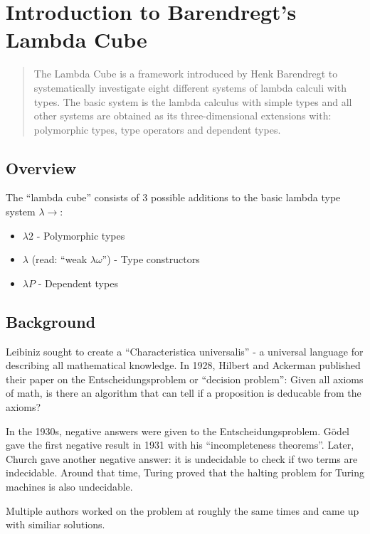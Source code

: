 \section{Introduction to Barendregt's Lambda Cube}
\begin{abstract}
	The Lambda Cube is a framework introduced by Henk Barendregt to systematically investigate eight different systems of lambda calculi with types. The basic system is the lambda calculus with simple types and all other systems are obtained as its three-dimensional extensions with: polymorphic types, type operators and dependent types.
\end{abstract}

\subsection{Overview}
The ``lambda cube'' consists of 3 possible additions to the basic lambda type system $\lambda\to$:
\begin{itemize}
	\item $\lambda2$ - Polymorphic types
	\item $\lambda$\underbar{$\omega$} (read: ``weak $\lambda\omega$'') - Type constructors
	\item $\lambda P$ - Dependent types
\end{itemize}

\subsection{Background}
Leibiniz sought to create a ``Characteristica universalis'' - a universal language for describing all mathematical knowledge.
In 1928, Hilbert and Ackerman published their paper on the Entscheidungsproblem or ``decision problem'': Given all axioms
of math, is there an algorithm that can tell if a proposition is deducable from the axioms?

In the 1930s, negative answers were given to the Entscheidungsproblem. G\"odel gave the first negative result in 1931
with his ``incompleteness theorems''. Later, Church gave another negative answer: it is undecidable to check if
two \lc terms are indecidable. Around that time, Turing proved that the halting problem for Turing
machines is also undecidable.

Multiple authors worked on the problem at roughly the same times and came up with similiar solutions.

